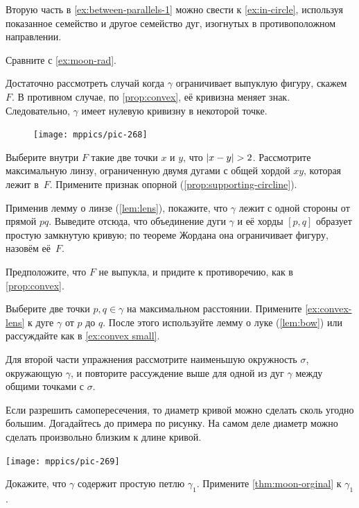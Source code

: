 \begin{multicols}{2}
Вторую часть в \ref{ex:between-parallels-1} можно свести к \ref{ex:in-circle}, используя показанное семейство и другое семейство дуг, изогнутых в противоположном направлении.

Сравните с \ref{ex:moon-rad}.

Достаточно рассмотреть случай когда $\gamma$ ограничивает выпуклую фигуру, скажем~$F$.
В противном случае, по \ref{prop:convex}, её кривизна меняет знак.
Следовательно, $\gamma$ имеет нулевую кривизну в некоторой точке.


\begin{figure}
\vskip-5mm
\centering
\texttt{[image: mppics/pic-268]}
\vskip0mm
\end{figure}

Выберите внутри $F$ такие две точки $x$ и $y$, что $|x\z-y|\z>2$.
Рассмотрите максимальную линзу, ограниченную двумя дугами с общей хордой $xy$, которая лежит в~$F$.
Примените признак опорной (\ref{prop:supporting-circline}).

Применив лемму о линзе (\ref{lem:lens}), покажите, что $\gamma$ лежит с одной стороны от прямой $pq$.
Выведите отсюда, что объединение дуги $\gamma$ и её хорды $[p,q]$ образует простую замкнутую кривую;
по теореме Жордана она ограничивает фигуру, назовём её~$F$.

Предположите, что $F$ не выпукла, и придите к противоречию, как в \ref{prop:convex}.

Выберите две точки $p,q\in\gamma$ на максимальном расстоянии.
Примените \ref{ex:convex-lens} к дуге $\gamma$ от $p$ до $q$.
После этого используйте лемму о луке (\ref{lem:bow}) или рассуждайте как в \ref{ex:convex small}.

Для второй части упражнения рассмотрите наименьшую окружность $\sigma$, окружающую $\gamma$, и повторите рассуждение выше для одной из дуг $\gamma$ между общими точками с $\sigma$.

Если разрешить самопересечения, то диаметр кривой можно сделать сколь угодно большим.
Догадайтесь до примера по рисунку.
На самом деле диаметр можно сделать произвольно близким к длине кривой.
\begin{Figure}
\vskip-0mm
\centering
\texttt{[image: mppics/pic-269]}
\vskip-0mm
\end{Figure}

Докажите, что $\gamma$ содержит простую петлю $\gamma_1$.
Примените \ref{thm:moon-orginal} к $\gamma_1$.


\end{multicols}
